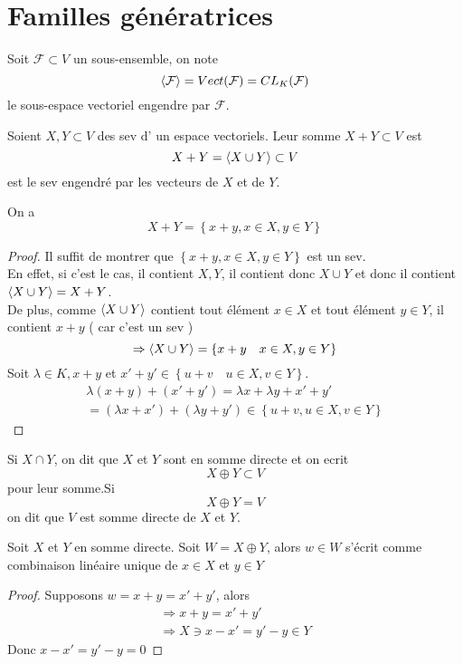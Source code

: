 \documentclass[../main.tex]{subfiles}
\begin{document}
\section{Familles génératrices}
\begin{defn}
Soit $ \mathcal{F}\subset V$ un sous-ensemble, on note
\[ 
	\left\langle \mathcal{F}\right\rangle = Vect( \mathcal{F}) = CL_K( \mathcal{F})
\]
le sous-espace vectoriel engendre par $ \mathcal{F}$.
\end{defn}
\begin{defn}
Soient $X,Y\subset V$ des sev d' un espace vectoriels. Leur somme $X+Y\subset V$ est
\[ 
	X+Y = \left\langle X\cup Y\right\rangle \subset V
\]
est le sev engendré par les vecteurs de $X$ et de $Y$.
\end{defn}
\begin{lemma}
On a 
\[ 
X+Y = \left\{ x+y, x\in X, y \in Y \right\} 
\]

\end{lemma}
\begin{proof}
Il suffit de montrer que $ \left\{ x+y ,    x\in X, y\in Y \right\} $ est un sev.\\
En effet, si c'est le cas, il contient $X,Y$, il contient donc $X\cup Y$ et donc il contient $ \left\langle X\cup Y\right\rangle= X+Y$.\\
De plus, comme $\left\langle X\cup Y\right\rangle$ contient tout élément $x\in X$ et tout élément $y\in Y$, il contient $x+y$ ( car c'est un sev )
\[ 
	\Rightarrow \left\langle X\cup Y\right\rangle = \left\{ x+y\quad x\in X, y \in Y \right\} 
\]
Soit $\lambda\in K, x+y $ et $ x'+y'\in \left\{ u+v\quad u\in X, v\in Y \right\} $.
\begin{align*}
\lambda(x+y) + ( x'+y')= \lambda x +\lambda y + x' + y'\\
= ( \lambda x + x') + ( \lambda y + y') \in \left\{ u+v, u \in X, v \in Y \right\} 
\end{align*}
	
\end{proof}
\begin{defn}[Notations]
	Si $X\cap Y$, on dit que $X$ et $Y$ sont en somme directe et on ecrit
	\[ 
	X \oplus Y \subset V
	\]
	pour leur somme.Si
	\[ 
	X \oplus Y =V
	\]
	on dit que $V$ est somme directe de $X$ et $Y$.

\end{defn}

\begin{propo}
Soit $X$ et $Y$ en somme directe. Soit $W=X\oplus Y$, alors $w \in W$ s'écrit comme combinaison linéaire unique de $x\in X$ et $y\in Y$
\end{propo}
\begin{proof}
Supposons $w=x+y= x'+y'$, alors
 \begin{align*}
\Rightarrow x+y=x'+y'\\
\Rightarrow X\ni x-x' = y'-y \in Y
\end{align*}
Donc $x-x'=y'-y =0$
\end{proof}
\end{document}
